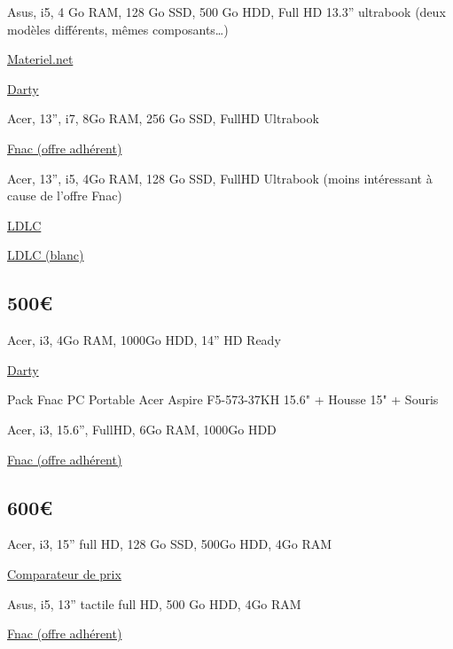 \documentclass{ki}
\begin{document}
Asus, i5, 4 Go RAM, 128 Go SSD, 500 Go HDD, Full HD 13.3” ultrabook (deux modèles différents, mêmes composants…)

\href{http://www.materiel.net/ordinateur-portable/asus-ux310ua-fc233t-i5-4-go-hdd-ssd-full-hd-132419.html}{Materiel.net}

\href{http://www.darty.com/nav/achat/informatique/ordinateur_portable-portable/portable/asus_ux310ua-gl123t.html}{Darty}

Acer, 13”, i7, 8Go RAM, 256 Go SSD, FullHD Ultrabook

\href{http://www.fnac.com/PC-Ultra-Portable-Acer-Aspire-V3-372-76T6-13/a9756528/w-4}{Fnac (offre adhérent)}

Acer, 13”, i5, 4Go RAM, 128 Go SSD, FullHD Ultrabook (moins intéressant à cause de l’offre Fnac)

\href{http://www.ldlc.com/fiche/PB00214402.html}{LDLC}

\href{http://www.ldlc.com/fiche/PB00214411.html}{LDLC (blanc)}

\subsection{500€}

Acer, i3, 4Go RAM, 1000Go HDD, 14” HD Ready

\href{http://www.darty.com/nav/achat/informatique/ordinateur_portable-portable/portable/acer_aspire_e5-475-31a7.html}{Darty}

Pack Fnac PC Portable Acer Aspire F5-573-37KH 15.6" + Housse 15" + Souris

Acer, i3, 15.6”, FullHD, 6Go RAM, 1000Go HDD

\href{http://www.fnac.com/Pack-Fnac-PC-Portable-Acer-Aspire-F5-573-37KH-15-6-Housse-15-Souris/a9865193/w-4}{Fnac (offre adhérent)}

\newpage
\subsection{600€}

Acer, i3, 15” full HD, 128 Go SSD, 500Go HDD, 4Go RAM

\href{http://www.prix-portables.fr/PC%20portable/19767/Acer,Aspire-e5-575-33av-ssd-full-hd-noir.html}{Comparateur de prix}

Asus, i5, 13” tactile full HD, 500 Go HDD, 4Go RAM

\href{http://www.prix-portables.fr/PC%20portable%20tactile/19652/Asus,Vivobook-flip-tp301ua-dw027t-tactile.html}{Fnac (offre adhérent)}
\end{document}
